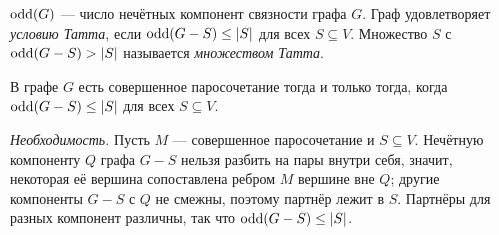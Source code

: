 \begin{definition}
\(\operatorname{odd}(G)\) — число нечётных компонент связности графа \(G\).
Граф удовлетворяет \emph{условию Татта}, если \(\operatorname{odd}(G-S)\le|S|\) для всех
\(S\subseteq V\). Множество \(S\) с \(\operatorname{odd}(G-S)>|S|\) называется
\emph{множеством Татта}.
\end{definition}
\begin{theorem}[Татт, 1947]
В графе \(G\) есть совершенное паросочетание тогда и только тогда, когда
\(\operatorname{odd}(G-S)\le|S|\) для всех \(S\subseteq V\).
\end{theorem}
\textit{Необходимость.} Пусть \(M\) — совершенное паросочетание и \(S\subseteq V\).
Нечётную компоненту \(Q\) графа \(G-S\) нельзя разбить на пары внутри себя,
значит, некоторая её вершина сопоставлена ребром \(M\) вершине вне \(Q\);
другие компоненты \(G-S\) с \(Q\) не смежны, поэтому партнёр лежит в \(S\).
Партнёры для разных компонент различны, так что \(\operatorname{odd}(G-S)\le|S|\).


